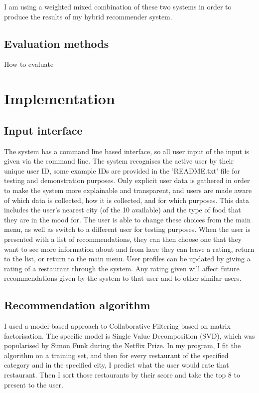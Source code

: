 \documentclass[conference]{IEEEtran}
\begin{document}
I am using a weighted mixed combination of these two systems in order to produce the results
of my hybrid recommender system.

\subsection{Evaluation methods}
How to evaluate


\section{Implementation}

\subsection{Input interface}
The system has a command line based interface, so all user input of the input is given via the command line. 
The system recognises the active user by their unique user ID, some example IDs are provided in the 'README.txt' 
file for testing and demonstration purposes. 
Only explicit user data is gathered in order to make the system more explainable and transparent, 
and users are made aware of which data is collected, how it is collected, and for which purposes. 
This data includes the user's nearest city (of the 10 available) and the type of food that 
they are in the mood for. 
The user is able to change these choices from the main menu, as well as switch to a different user 
for testing purposes. 
When the user is presented with a list of recommendations, they can then choose one that they want 
to see more information about and from here they can leave a rating, return to the list, or return to 
the main menu. 
User profiles can be updated by giving a rating of a restaurant through the system. 
Any rating given will affect future recommendations given by the system to that user 
and to other similar users. 

\subsection{Recommendation algorithm}
I used a model-based approach to Collaborative Filtering based on matrix factorisation. 
The specific model is Single Value Decomposition (SVD), which was popularised by Simon Funk during the Netflix Prize. 
In my program, I fit the algorithm on a training set, and then for every restaurant of the specified category 
and in the specified city, I predict what the user would rate that restaurant. 
Then I sort those restaurants by their score and take the top 8 to present to the user. 
\end{document}
